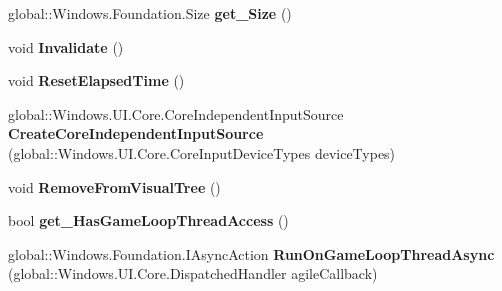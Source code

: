 \begin{DoxyCompactItemize}
global\+::\+Windows.\+Foundation.\+Size {\bfseries get\+\_\+\+Size} ()
\item 
\mbox{\label{interface_microsoft_1_1_graphics_1_1_canvas_1_1_u_i_1_1_xaml_1_1_i_canvas_animated_control_a6e8c0716bccdc59c0d061ebb9cb24d26}} 
void {\bfseries Invalidate} ()
\item 
\mbox{\label{interface_microsoft_1_1_graphics_1_1_canvas_1_1_u_i_1_1_xaml_1_1_i_canvas_animated_control_ab79482e0b3f29fdc17a208ff9e241966}} 
void {\bfseries Reset\+Elapsed\+Time} ()
\item 
\mbox{\label{interface_microsoft_1_1_graphics_1_1_canvas_1_1_u_i_1_1_xaml_1_1_i_canvas_animated_control_a60019a5524becce29e2143af4c04fd6e}} 
global\+::\+Windows.\+U\+I.\+Core.\+Core\+Independent\+Input\+Source {\bfseries Create\+Core\+Independent\+Input\+Source} (global\+::\+Windows.\+U\+I.\+Core.\+Core\+Input\+Device\+Types device\+Types)
\item 
\mbox{\label{interface_microsoft_1_1_graphics_1_1_canvas_1_1_u_i_1_1_xaml_1_1_i_canvas_animated_control_a07c176ef557d7e5ee57dcdd022db16e6}} 
void {\bfseries Remove\+From\+Visual\+Tree} ()
\item 
\mbox{\label{interface_microsoft_1_1_graphics_1_1_canvas_1_1_u_i_1_1_xaml_1_1_i_canvas_animated_control_ab16eea1af618b2cac579d8d9f187797f}} 
bool {\bfseries get\+\_\+\+Has\+Game\+Loop\+Thread\+Access} ()
\item 
\mbox{\label{interface_microsoft_1_1_graphics_1_1_canvas_1_1_u_i_1_1_xaml_1_1_i_canvas_animated_control_ae25407f319ca08c1102170a3ffa753d2}} 
global\+::\+Windows.\+Foundation.\+I\+Async\+Action {\bfseries Run\+On\+Game\+Loop\+Thread\+Async} (global\+::\+Windows.\+U\+I.\+Core.\+Dispatched\+Handler agile\+Callback)
\item 

\end{DoxyCompactItemize}
